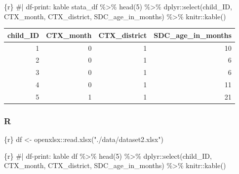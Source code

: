 \documentclass[
  letterpaper,
  DIV=11,
  numbers=noendperiod,
  oneside]{scrreprt}
\newenvironment{Shaded}{\begin{snugshade}}{\end{snugshade}}
\newcommand{\CommentTok}[1]{\textcolor[rgb]{0.37,0.37,0.37}{#1}}
\newcommand{\DecValTok}[1]{\textcolor[rgb]{0.68,0.00,0.00}{#1}}
\newcommand{\FunctionTok}[1]{\textcolor[rgb]{0.28,0.35,0.67}{#1}}
\newcommand{\InformationTok}[1]{\textcolor[rgb]{0.37,0.37,0.37}{#1}}
\newcommand{\NormalTok}[1]{\textcolor[rgb]{0.00,0.23,0.31}{#1}}
\newcommand{\OtherTok}[1]{\textcolor[rgb]{0.00,0.23,0.31}{#1}}
\newcommand{\SpecialCharTok}[1]{\textcolor[rgb]{0.37,0.37,0.37}{#1}}
\newcommand{\StringTok}[1]{\textcolor[rgb]{0.13,0.47,0.30}{#1}}
\begin{document}
\begin{Shaded}
\begin{Highlighting}[]
\InformationTok{\textasciigrave{}\textasciigrave{}\textasciigrave{}\{r\}}
\CommentTok{\#| df{-}print: kable}
\NormalTok{stata\_df }\SpecialCharTok{\%\textgreater{}\%}
  \FunctionTok{head}\NormalTok{(}\DecValTok{5}\NormalTok{) }\SpecialCharTok{\%\textgreater{}\%}
\NormalTok{  dplyr}\SpecialCharTok{::}\FunctionTok{select}\NormalTok{(child\_ID,}
\NormalTok{                CTX\_month,}
\NormalTok{                CTX\_district,}
\NormalTok{                SDC\_age\_in\_months) }\SpecialCharTok{\%\textgreater{}\%}
\NormalTok{  knitr}\SpecialCharTok{::}\FunctionTok{kable}\NormalTok{()}
\InformationTok{\textasciigrave{}\textasciigrave{}\textasciigrave{}}
\end{Highlighting}
\end{Shaded}

\begin{longtable}[]{@{}rrrr@{}}
\toprule()
child\_ID & CTX\_month & CTX\_district & SDC\_age\_in\_months \\
\midrule()
\endhead
1 & 0 & 1 & 10 \\
2 & 0 & 1 & 6 \\
3 & 0 & 1 & 6 \\
4 & 0 & 1 & 11 \\
5 & 1 & 1 & 21 \\
\bottomrule()
\end{longtable}

\hypertarget{r-4}{%
\subsubsection{R}\label{r-4}}

\begin{Shaded}
\begin{Highlighting}[]
\InformationTok{\textasciigrave{}\textasciigrave{}\textasciigrave{}\{r\}}
\NormalTok{df }\OtherTok{\textless{}{-}}\NormalTok{ openxlsx}\SpecialCharTok{::}\FunctionTok{read.xlsx}\NormalTok{(}\StringTok{"./data/dataset2.xlsx"}\NormalTok{)}
\InformationTok{\textasciigrave{}\textasciigrave{}\textasciigrave{}}
\end{Highlighting}
\end{Shaded}

\begin{Shaded}
\begin{Highlighting}[]
\InformationTok{\textasciigrave{}\textasciigrave{}\textasciigrave{}\{r\}}
\CommentTok{\#| df{-}print: kable}
\NormalTok{df }\SpecialCharTok{\%\textgreater{}\%}
  \FunctionTok{head}\NormalTok{(}\DecValTok{5}\NormalTok{) }\SpecialCharTok{\%\textgreater{}\%}
\NormalTok{  dplyr}\SpecialCharTok{::}\FunctionTok{select}\NormalTok{(child\_ID,}
\NormalTok{                CTX\_month,}
\NormalTok{                CTX\_district,}
\NormalTok{                SDC\_age\_in\_months) }\SpecialCharTok{\%\textgreater{}\%}
\NormalTok{  knitr}\SpecialCharTok{::}\FunctionTok{kable}\NormalTok{()}
\InformationTok{\textasciigrave{}\textasciigrave{}\textasciigrave{}}
\end{Highlighting}
\end{Shaded}
\end{document}
